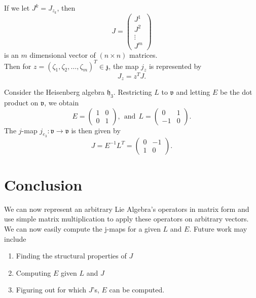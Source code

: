 \documentclass[11 pt]{article}
\newcommand{\fz}{\mathfrak{z}}
\newcommand{\fv}{\mathfrak{v}}
\newcommand{\fh}{\mathfrak{h}}
\begin{document}
    If we let $J^k = J_{z_k}$, then
    $$
    J = \begin{pmatrix}
        J^1 \\ J^2 \\ \vdots \\ J^m
    \end{pmatrix}
    $$
    is an $m$ dimensional vector of $(n \times n)$ matrices.
    \\
    Then for $z = (\zeta_1,\zeta_2,\hdots,\zeta_m)^T \in \fz$, the map $j_z$
    is represented by
    \\
    $$
    J_z = z^TJ.
    $$
    \begin{example}
        Consider the Heisenberg algebra $\fh_3$. Restricting $L$ to
        $\fv$ and
        letting $E$ be the dot product on $\fv$, we obtain
        $$
        E = \begin{pmatrix}
            1 & 0 \\ 0 & 1
        \end{pmatrix},\ \ \text{and}\ \ L = \begin{pmatrix}
            0 & 1 \\ -1 & 0
        \end{pmatrix}.
        $$
        The $j$-map $j_{e_3} :\fv \to \fv$ is then given by 
        $$
        J = E^{-1}L^T = \begin{pmatrix}
            0 & -1 \\ 1 & 0
        \end{pmatrix}.
        $$
    \end{example}
\section{Conclusion}
    We can now represent an arbitrary Lie Algebra's operators in matrix form
    and use simple matrix multiplication to apply these operators on
    arbitrary vectors.  We can now easily compute the j-maps for a given $L$
    and $E$.  Future work may include
    \begin{enumerate}
        \item Finding the structural properties of $J$
        \item Computing $E$ given $L$ and $J$
        \item Figuring out for which $J$'s, $E$ can be computed.
    \end{enumerate}
\end{document}
